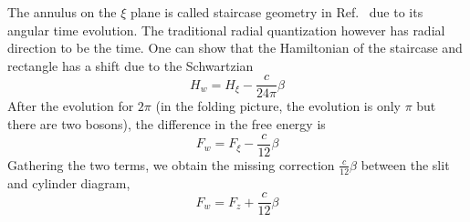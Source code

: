 The annulus on the $\xi$ plane is called staircase geometry in Ref.~ due to its angular time evolution. The traditional radial quantization however has radial direction to be the time. One can show that the Hamiltonian of the staircase and rectangle has a shift due to the Schwartzian\cite{cardy_finite-size_1988}
\begin{equation}
H_{w} = H_{\xi} - \frac{c}{24\pi} \beta 
\end{equation}
After the evolution for $2\pi$ (in the folding picture, the evolution is only $\pi$ but there are two bosons), the difference in the free energy is
\begin{equation}
F_w = F_{\xi} - \frac{c}{12} \beta 
\end{equation}
Gathering the two terms, we obtain the missing correction $\frac{c}{12} \beta$ between the slit and cylinder diagram, 
\begin{equation}
F_{w} = F_z + \frac{c}{12}\beta
\end{equation}


